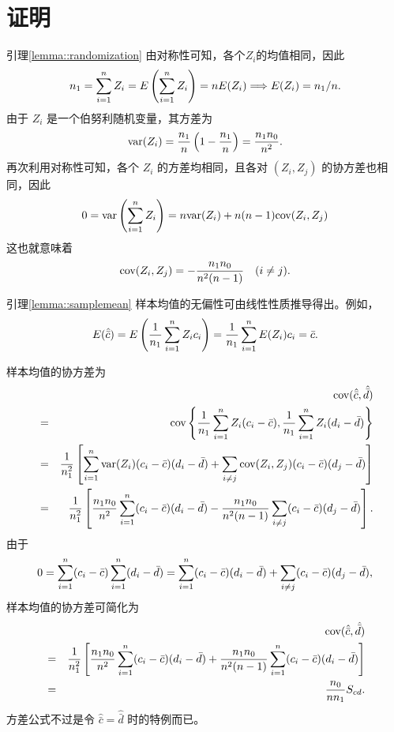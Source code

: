 \section{证明}




\begin{myproof}{引理}{\ref{lemma::randomization}}
由对称性可知，各个$Z_i$的均值相同，因此
$$
n_1 = \sum_{i=1}^n Z_i = E\left (  \sum_{i=1}^n Z_i  \right  )  = n E(Z_i)
\Longrightarrow  E(Z_i) = n_1/n .
$$
由于 $Z_i$ 是一个伯努利随机变量，其方差为  
$$
\textup{var}(Z_i) = \frac{n_1}{ n} \left(1 - \frac{n_1}{n} \right) = \frac{n_1 n_0}{n^2}.
$$  
再次利用对称性可知，各个 $Z_i$ 的方差均相同，且各对 $(Z_i, Z_j)$ 的协方差也相同，因此  
$$
0 = \textup{var}\left(   \sum_{i=1}^n Z_i \right)   = n   \textup{var}(Z_i) + n(n-1) \textup{cov}(Z_i, Z_j)
$$  
这也就意味着  
$$
\textup{cov}(Z_i, Z_j) = - \frac{n_1 n_0 } { n^2 (n-1)  }  \quad (i\neq j).
$$
\end{myproof}




 

\begin{myproof}{引理}{\ref{lemma::samplemean}}
样本均值的无偏性可由线性性质推导得出。例如，
$$
E( \hat{\bar{c}} ) = E\left(   \frac{1}{n_1} \sum_{i=1}^n Z_i c_i \right) =   \frac{1}{n_1} \sum_{i=1}^n E(Z_i) c_i =  \bar{c} .
$$

样本均值的协方差为
\begin{eqnarray*}
&&\textup{cov}( \hat{\bar{c}} ,  \hat{\bar{d}}  ) \\
&=& \textup{cov}\left\{      \frac{1}{n_1} \sum_{i=1}^n Z_i (c_i -  \bar{c}  ) ,   \frac{1}{n_1} \sum_{i=1}^n Z_i (d_i -  \bar{d}   )\right\} \\
&=& \frac{1}{n_1^2} \left[ \sum_{i=1}^n \textup{var}(Z_i) (c_i -  \bar{c}  ) (d_i -  \bar{d}   ) + 
\sum_{i\neq j} \textup{cov}(Z_i, Z_j) (c_i -  \bar{c}  )(d_j -  \bar{d}   ) 
\right] \\
&=& \frac{1}{n_1^2} \left[ \frac{n_1 n_0}{n^2} \sum_{i=1}^n   (c_i -  \bar{c}  )(d_i -  \bar{d}   )
-\frac{n_1 n_0 } { n^2 (n-1)  }
\sum_{i\neq j}  (c_i -  \bar{c}  )(d_j -  \bar{d}   ) 
\right] .
\end{eqnarray*}
由于
$$
0 =   \sum_{i=1}^n   (c_i -  \bar{c}  )  \sum_{i=1}^n   (d_i -  \bar{d}   )  
= 
\sum_{i=1}^n   (c_i -  \bar{c}  )(d_i -  \bar{d}   )   + 
\sum_{i\neq j}  (c_i -  \bar{c}  )(d_j -  \bar{d}   ) ,
$$
样本均值的协方差可简化为
\begin{eqnarray*}
&&\textup{cov}( \hat{\bar{c}} ,  \hat{\bar{d}} )  \\
&=& \frac{1}{n_1^2} \left[ \frac{n_1 n_0}{n^2} \sum_{i=1}^n   (c_i -  \bar{c}  ) (d_i -  \bar{d}   ) 
+\frac{n_1 n_0 } { n^2 (n-1)  }
\sum_{i=1}^n   (c_i -  \bar{c}  ) (d_i -  \bar{d}  ) 
\right]  \\
&=& \frac{n_0}{nn_1} S_{cd}.
\end{eqnarray*}
方差公式不过是令 $ \hat{\bar{c}}  =  \hat{\bar{d}}  $ 时的特例而已。 
\end{myproof}




